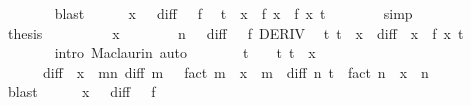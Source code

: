 \begin{isabellebody}
\ \ \ \ \ \ \isamarkupfalse%
\ blast\isanewline
\ \ \ \ \isamarkupfalse%
\ {\isacartoucheopen}x\ {\isacharless}{\kern0pt}\ {}{\isacartoucheclose}\ {\isacartoucheopen}diff\ {}\ {\isacharequal}{\kern0pt}\ f{\isacartoucheclose}\ \isamarkupfalse%
\ {\isachardoublequoteopen}{\isasymbar}t{\isasymbar}\ {\isasymle}\ {\isasymbar}x{\isasymbar}\ {\isasymand}\ f\ x\ {\isacharequal}{\kern0pt}\ {\isacharquery}{\kern0pt}f\ x\ t{\isachardoublequoteclose}\isanewline
\ \ \ \ \ \ \isamarkupfalse%
\ simp\isanewline
\ \ \ \ \isamarkupfalse%
\ \isamarkupfalse%
\ {\isacharquery}{\kern0pt}thesis\ \isacommand{{\isachardot}{\kern0pt}{\isachardot}{\kern0pt}}\isamarkupfalse%
\isanewline
\ \ \isamarkupfalse%
\isanewline
\ \ \ \ \isamarkupfalse%
\ {\isachardoublequoteopen}x\ {\isachargreater}{\kern0pt}\ {}{\isachardoublequoteclose}\isanewline
\ \ \ \ \isamarkupfalse%
\ {\isacartoucheopen}n\ {\isasymnoteq}\ {}{\isacartoucheclose}\ {\isacartoucheopen}diff\ {}\ {\isacharequal}{\kern0pt}\ f{\isacartoucheclose}\ DERIV\ \isamarkupfalse%
\ {\isachardoublequoteopen}{\isasymexists}t{\isachargreater}{\kern0pt}{}{\isachardot}{\kern0pt}\ t\ {\isacharless}{\kern0pt}\ x\ {\isasymand}\ diff\ {}\ x\ {\isacharequal}{\kern0pt}\ {\isacharquery}{\kern0pt}f\ x\ t{\isachardoublequoteclose}\isanewline
\ \ \ \ \ \ \isamarkupfalse%
\ {\isacharparenleft}{\kern0pt}intro\ Maclaurin{\isacharparenright}{\kern0pt}\ auto\isanewline
\ \ \ \ \isamarkupfalse%
\ \isamarkupfalse%
\ t\ \ {\isachardoublequoteopen}{}\ {\isacharless}{\kern0pt}\ t{\isachardoublequoteclose}\ {\isachardoublequoteopen}t\ {\isacharless}{\kern0pt}\ x{\isachardoublequoteclose}\isanewline
\ \ \ \ \ \ {\isachardoublequoteopen}diff\ {}\ x\ {\isacharequal}{\kern0pt}\ {\isacharparenleft}{\kern0pt}{\isasymSum}m{\isacharless}{\kern0pt}n{\isachardot}{\kern0pt}\ diff\ m\ {}\ {\isacharslash}{\kern0pt}\ fact\ m\ {\isacharasterisk}{\kern0pt}\ x\ {\isacharcircum}{\kern0pt}\ m{\isacharparenright}{\kern0pt}\ {\isacharplus}{\kern0pt}\ diff\ n\ t\ {\isacharslash}{\kern0pt}\ fact\ n\ {\isacharasterisk}{\kern0pt}\ x\ {\isacharcircum}{\kern0pt}\ n{\isachardoublequoteclose}\isanewline
\ \ \ \ \ \ \isamarkupfalse%
\ blast\isanewline
\ \ \ \ \isamarkupfalse%
\ {\isacartoucheopen}x\ {\isachargreater}{\kern0pt}\ {}{\isacartoucheclose}\ {\isacartoucheopen}diff\ {}\ {\isacharequal}{\kern0pt}\ f{\isacartoucheclose}\ \isamarkupfalse%

\end{isabellebody}

